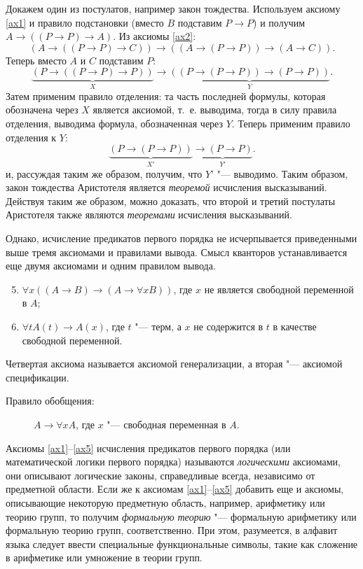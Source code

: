 \documentclass[b5paper,11pt]{book}
\numberwithin{Def}{section}
\numberwithin{Th}{chapter}
\numberwithin{St}{chapter}
\begin{document}
	Докажем один из постулатов, например закон тождества. Используем  аксиому \ref{ax1} и правило подстановки (вместо $B$ подставим $P\rightarrow P$) и получим $A\rightarrow((P\rightarrow P)\rightarrow A)$. Из аксиомы \ref{ax2}:
	\[
		(A\rightarrow((P\rightarrow P)\rightarrow C))\rightarrow((A\rightarrow(P\rightarrow P))\rightarrow(A\rightarrow C)).
	\]
	Теперь вместо $A$ и $C$ подставим $P$:  
	\[
		\underbrace{(P\rightarrow((P\rightarrow P)\rightarrow P))}_{X}\rightarrow\underbrace{((P\rightarrow(P\rightarrow P))\rightarrow(P\rightarrow P))}_{Y}.
	\]
	Затем применим правило отделения: та часть последней формулы, которая обозначена через $X$ является аксиомой, т.~е. выводима, тогда в силу правила отделения, выводима формула, обозначенная через $Y$. Теперь применим правило отделения к $Y$: 
	\[
		\underbrace{(P\rightarrow(P\rightarrow P))}_{X'}\underbrace{\rightarrow(P\rightarrow P)}_{Y'}.
	\]
	и, рассуждая таким же образом, получим, что $Y’$ "--- выводимо. Таким образом, закон тождества Аристотеля является \textit{теоремой} исчисления высказываний. Действуя таким же образом, можно доказать, что второй и третий постулаты Аристотеля также являются \textit{теоремами} исчисления высказываний.
	
	Однако, исчисление предикатов первого порядка не исчерпывается приведенными выше тремя аксиомами и правилами вывода. Смысл кванторов устанавливается еще двумя аксиомами и одним правилом вывода.
	\begin{enumerate}
		\setcounter{enumi}{4}
		\item\label{ax4} $\forall x((A\rightarrow B)\rightarrow(A\rightarrow\forall x B))$, где $x$ не является свободной переменной в $A$;
		\item\label{ax5} $\forall t A(t)\rightarrow A(x)$, где $t$ "--- терм, а $x$ не содержится в $t$ в качестве свободной переменной.
	\end{enumerate}
	Четвертая аксиома называется аксиомой генерализации, а вторая "--- аксиомой спецификации.
	
	\begin{description}
		\item[Правило обобщения:] $A\rightarrow\forall xA$, где $x$ "--- свободная переменная в $A$.
	\end{description}

	Аксиомы \ref{ax1}--\ref{ax5} исчисления предикатов первого порядка (или математической логики первого порядка) называются \textit{логическими} аксиомами, они описывают логические законы, справедливые всегда, независимо от предметной области. Если же к аксиомам \ref{ax1}--\ref{ax5} добавить еще и аксиомы, описывающие некоторую предметную область, например, арифметику или теорию групп, то получим \textit{формальную теорию} "---  формальную арифметику или формальную теорию групп, соответственно. При этом, разумеется, в алфавит языка следует ввести специальные функциональные символы, такие как сложение в арифметике или умножение в теории групп.
	
\end{document}
